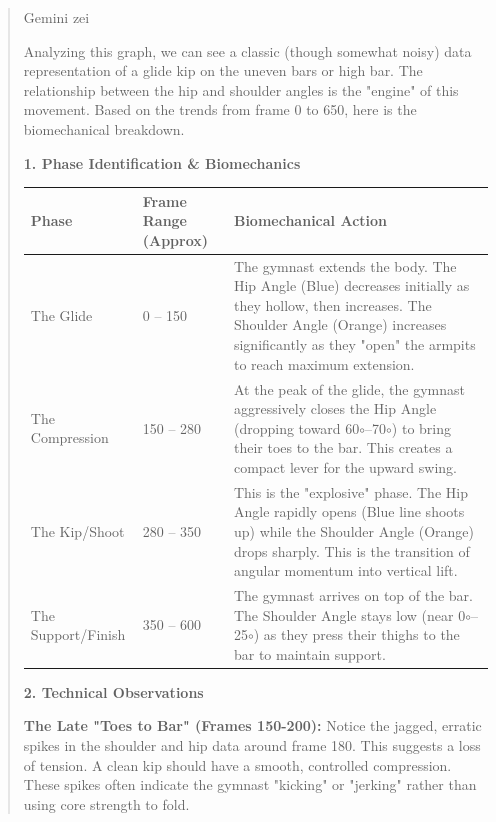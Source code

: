 \begin{quote}
    Gemini zei
    
    Analyzing this graph, we can see a classic (though somewhat noisy) data representation of a glide kip on the uneven bars or high bar. The relationship between the hip and shoulder angles is the "engine" of this movement.
    Based on the trends from frame 0 to 650, here is the biomechanical breakdown.
    
    \textbf{1. Phase Identification \& Biomechanics}
    
    \vspace{0.3cm}
    
    \begin{tabularx}{\textwidth}{|l|l|X|}
        \hline
        \textbf{Phase} & \textbf{Frame Range (Approx)} & \textbf{Biomechanical Action} \\ \hline
        The Glide & 0 -- 150 & The gymnast extends the body. The Hip Angle (Blue) decreases initially as they hollow, then increases. The Shoulder Angle (Orange) increases significantly as they "open" the armpits to reach maximum extension. \\ \hline
        The Compression & 150 -- 280 & At the peak of the glide, the gymnast aggressively closes the Hip Angle (dropping toward 60$\circ$--70$\circ$) to bring their toes to the bar. This creates a compact lever for the upward swing. \\ \hline
        The Kip/Shoot & 280 -- 350 & This is the "explosive" phase. The Hip Angle rapidly opens (Blue line shoots up) while the Shoulder Angle (Orange) drops sharply. This is the transition of angular momentum into vertical lift. \\ \hline
        The Support/Finish & 350 -- 600 & The gymnast arrives on top of the bar. The Shoulder Angle stays low (near 0$\circ$--25$\circ$) as they press their thighs to the bar to maintain support. \\ \hline
    \end{tabularx}
    
    \vspace{0.4cm}
    
    \textbf{2. Technical Observations}
    
    \textbf{The Late "Toes to Bar" (Frames 150-200):} Notice the jagged, erratic spikes in the shoulder and hip data around frame 180. This suggests a loss of tension. A clean kip should have a smooth, controlled compression. These spikes often indicate the gymnast "kicking" or "jerking" rather than using core strength to fold.
    

\end{quote}
